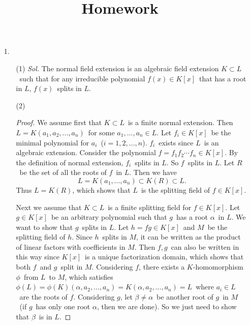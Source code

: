 \documentclass[12pt]{article}
\title{Homework}
\newcommand\Myperm[2][^n]{\prescript{#1\mkern-2.5mu}{}P_{#2}}
\newcommand\Mycomb[2][^n]{\prescript{#1\mkern-0.5mu}{}C_{#2}}
\begin{document}
	




\begin{enumerate}
	\item[1.]
	\begin{enumerate}
		\item[(1)]
		\textit{Sol.}
			\quad The normal field extension is an algebraic field extension $K\subset L$\ such that for any irreducible polynomial $f(x)\in K[x]$\ that has a root in $L$, $f(x)$\ splits in $L$.
		\item[(2)]
		\begin{proof}
			\quad We assume first that $K\subset L$\ is a finite normal extension. Then $L=K(a_1,a_2,...,a_n)$\ for some $a_1,...,a_n\in L$. Let $f_i\in K[x]$\ be the minimal polynomial for $a_i$\ ($i=1,2,...,n$). $f_i$\ exists since $L$\ is an algebraic extension. Consider the polynomial $f=f_1f_2\cdots f_n\in K[x]$. By the definition of normal extension, $f_i$\ splits in $L$. So $f$\ splits in $L$. Let $R$\ be the set of all the roots of $f$\ in $L$. Then we have
			$$L=K(a_1,...,a_n)\subset K(R)\subset L.$$
			Thus $L=K(R)$, which shows that $L$\ is the splitting field of $f\in K[x]$.\par
			\quad Next we assume that $K\subset L$\ is a finite splitting field for $f\in K[x]$. Let $g\in K[x]$\ be an arbitrary polynomial such that $g$\ has a root $\alpha$\ in $L$. We want to show that $g$\ splits in $L$. Let $h=fg\in K[x]$\ and $M$\ be the splitting field of $h$. Since $h$\ splits in $M$, it can be written as the product of linear factors with coefficients in $M$. Then $f,g$\ can also be written in this way since $K[x]$\ is a unique factorization domain, which shows that both $f$\ and $g$\ split in $M$. Considering $f$, there exists a $K$-homomorphism $\phi$\ from $L$\ to $M$, which satisfies $\phi(L)=\phi(K)(\alpha,a_2,...,a_n)=K(\alpha,a_2,...,a_n)=L$\ where $a_i\in L$\ are the roots of $f$. Considering $g$, let $\beta\neq\alpha$\ be another root of $g$\ in $M$\ (if $g$\ has only one root $\alpha$, then we are done). So we just need to show that $\beta$\ is in $L$.\par

\end{proof}
\end{enumerate}
\end{enumerate}
\end{document}
